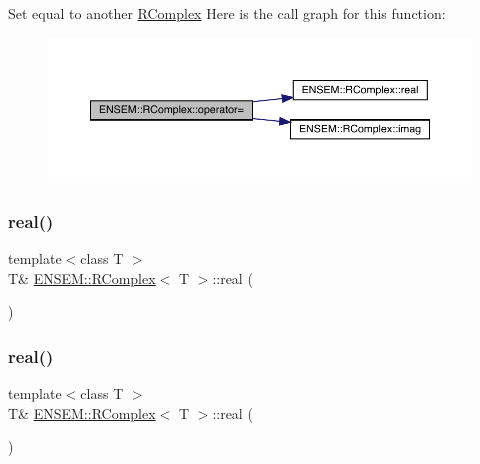 Set equal to another \mbox{\hyperlink{classENSEM_1_1RComplex}{R\+Complex}} Here is the call graph for this function\+:
\nopagebreak
\begin{figure}[H]
\begin{center}
\leavevmode
\includegraphics[width=350pt]{d9/d0e/classENSEM_1_1RComplex_a14a5d3857ebb326ed5f211cc30da3ced_cgraph}
\end{center}
\end{figure}
\mbox{\label{classENSEM_1_1RComplex_a1675e3defa774edeb1a7390bd14a86c8}} 
\subsubsection{\texorpdfstring{real()}{real()}\hspace{0.1cm}{\footnotesize\ttfamily [1/6]}}
{\footnotesize\ttfamily template$<$class T $>$ \\
T\& \mbox{\hyperlink{classENSEM_1_1RComplex}{E\+N\+S\+E\+M\+::\+R\+Complex}}$<$ T $>$\+::real (\begin{DoxyParamCaption}{ }\end{DoxyParamCaption})\hspace{0.3cm}{\ttfamily [inline]}}

\mbox{\label{classENSEM_1_1RComplex_a1675e3defa774edeb1a7390bd14a86c8}} 
\subsubsection{\texorpdfstring{real()}{real()}\hspace{0.1cm}{\footnotesize\ttfamily [2/6]}}
{\footnotesize\ttfamily template$<$class T $>$ \\
T\& \mbox{\hyperlink{classENSEM_1_1RComplex}{E\+N\+S\+E\+M\+::\+R\+Complex}}$<$ T $>$\+::real (\begin{DoxyParamCaption}{ }\end{DoxyParamCaption})\hspace{0.3cm}{\ttfamily [inline]}}

